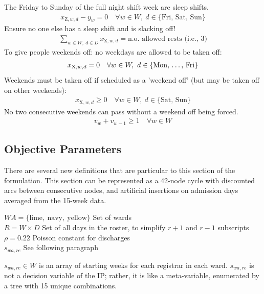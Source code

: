 \documentclass[a4paper]{article}
\begin{document}
The Friday to Sunday of the full night shift week are sleep shifts.
\begin{align}
  x_{\text{Z}, w, d} - y_w = 0 \quad\forall w\in W,\ d\in \{\text{Fri, Sat, Sun}\}
\end{align}
Ensure no one else has a sleep shift and is slacking off!
\begin{align}
  \sum_{w\in W,\ d\in D} x_{\text{Z}, w, d} = \text{n.o. allowed rests (i.e., 3)}
\end{align}
To give people weekends off: no weekdays are allowed to be taken off:
\begin{align}
  x_{\text{X}, w, d} = 0 \quad\forall w\in W,\ d\in \{\text{Mon, \dots, Fri}\}
\end{align}
Weekends must be taken off if scheduled as a 'weekend off' (but may be taken off on other weekends):
\begin{align}
  x_{\text{X}, w, d} \ge 0 \quad\forall w\in W,\ d\in \{\text{Sat, Sun}\}
\end{align}
No two consecutive weekends can pass without a weekend off being forced.
\begin{align}
  v_w + v_{w-1} \ge 1 \quad\forall w\in W
\end{align}

\subsection{Objective Parameters}

There are several new definitions that are particular to this section of the formulation. This section can be represented as a 42-node cycle with discounted arcs between consecutive nodes, and artificial insertions on admission days averaged from the 15-week data.

\begin{multicols}{2}
\begin{flushright}
$WA = \{\text{lime},\ \text{navy},\ \text{yellow}\}$ \dotfill Set of wards\\
$R = W\times D$ \dotfill Set of all days in the roster, to simplify $r+1$ and $r-1$ subscripts\\
$\rho = 0.22$ \dotfill Poisson constant for discharges\\
$s_{wa,re}$ \dotfill See following paragraph
\end{flushright}

$s_{wa, re} \in W$ is an array of starting weeks for each registrar in each ward. $s_{wa, re}$ is not a decision variable of the IP; rather, it is like a meta-variable, enumerated by a tree with 15 unique combinations.
\end{multicols}
\end{document}
